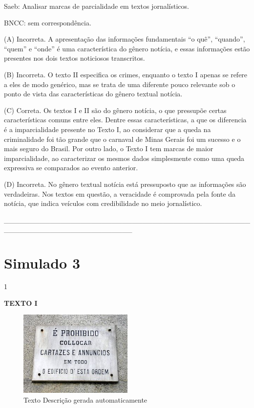 Saeb: Analisar marcas de parcialidade em textos jornalísticos.

BNCC: sem correspondência.

(A) Incorreta. A apresentação das informações fundamentais ``o quê'',
``quando'', ``quem'' e ``onde'' é uma característica do gênero notícia,
e essas informações estão presentes nos dois textos noticiosos
transcritos.

(B) Incorreta. O texto II especifica os crimes, enquanto o texto I
apenas se refere a eles de modo genérico, mas se trata de uma diferente
pouco relevante sob o ponto de vista das características do gênero
textual notícia.

(C) Correta. Os textos I e II são do gênero notícia, o que pressupõe
certas características comuns entre eles. Dentre essas características,
a que os diferencia é a imparcialidade presente no Texto I, ao
considerar que a queda na criminalidade foi tão grande que o carnaval de
Minas Gerais foi um sucesso e o mais seguro do Brasil. Por outro lado, o
Texto I tem marcas de maior imparcialidade, ao caracterizar os mesmos
dados simplesmente como uma queda expressiva se comparados ao evento
anterior.

(D) Incorreta. No gênero textual notícia está pressuposto que as
informações são verdadeiras. Nos textos em questão, a veracidade é
comprovada pela fonte da notícia, que indica veículos com credibilidade
no meio jornalístico.

\_\_\_\_\_\_\_\_\_\_\_\_\_\_\_\_\_\_\_\_\_\_\_\_\_\_\_\_\_\_\_\_\_\_\_\_\_\_\_\_\_\_\_\_\_\_\_\_\_\_\_\_\_\_\_\_\_\_\_\_\_\_\_\_\_\_\_\_\_\_\_\_\_

\section{Simulado 3}

\num{1}

\textbf{TEXTO I}

\begin{figure}
\centering
\includegraphics[width=2.21875in,height=1.66591in]{./imgSAEB_8_POR/media/image37.jpeg}
\caption{Texto Descrição gerada automaticamente}
\end{figure}

